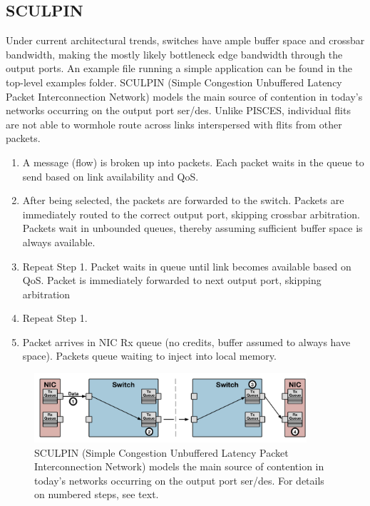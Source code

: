 \subsection{SCULPIN}
\label{subsec:sculpin}

Under current architectural trends, switches have ample buffer space and crossbar bandwidth, making the mostly likely bottleneck edge bandwidth through the output ports.
An example file running a simple application can be found in the top-level examples folder.
SCULPIN (Simple Congestion Unbuffered Latency Packet Interconnection Network) models the main source of contention in today's networks occurring on the output port ser/des. Unlike PISCES, individual flits are not able to wormhole route across links interspersed with flits from other packets.
\begin{enumerate}
\item A message (flow) is broken up into packets. Each packet waits in the queue to send based on link availability and QoS.
\item After being selected, the packets are forwarded to the switch. Packets are immediately routed to the correct output port, skipping crossbar arbitration. Packets wait in unbounded queues, thereby assuming sufficient buffer space is always available.
\item Repeat Step 1. Packet waits in queue until link becomes available based on QoS. Packet is immediately forwarded to next output port, skipping arbitration
\item Repeat Step 1.
\item Packet arrives in NIC Rx queue (no credits, buffer assumed to always have space). Packets queue waiting to inject into local memory.
\end{enumerate}

\begin{figure}
\centering
\includegraphics[width=0.9\textwidth]{figures/sculpin.png}
\caption[SCULPIN model]{SCULPIN (Simple Congestion Unbuffered Latency Packet Interconnection Network) models the main source of contention in today's networks occurring on the output port ser/des. For details on numbered steps, see text.}
\label{fig:sculpin}
\end{figure}


